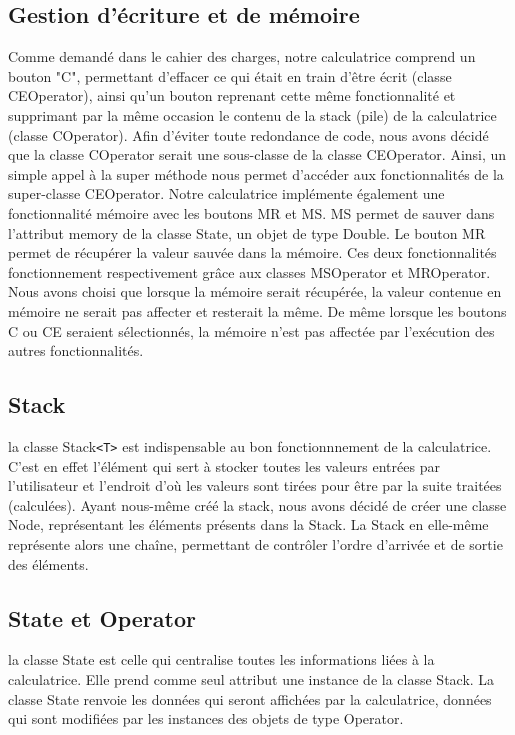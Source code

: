\documentclass[12pt]{report}
\begin{document}
        \subsection*{Gestion d'écriture et de mémoire}
            Comme demandé dans le cahier des charges, notre calculatrice comprend un bouton "C", permettant d'effacer ce qui était
    en train d'être écrit (classe CEOperator), ainsi qu'un bouton reprenant cette même fonctionnalité et supprimant par la même occasion le
    contenu de la stack (pile) de la calculatrice (classe COperator). Afin d'éviter toute redondance de code, nous avons décidé que
    la classe COperator serait une sous-classe de la classe CEOperator. Ainsi, un simple appel à la super méthode nous permet
    d'accéder aux fonctionnalités de la super-classe CEOperator.
    \newline Notre calculatrice implémente également une fonctionnalité mémoire avec les boutons MR et MS. MS permet de
    sauver dans l'attribut memory de la classe State, un objet de type Double. Le bouton MR permet de récupérer la valeur
    sauvée dans la mémoire. Ces deux fonctionnalités fonctionnement respectivement grâce aux classes MSOperator et MROperator.
    \newline Nous avons choisi que lorsque la mémoire serait récupérée, la valeur contenue en mémoire ne serait pas affecter et resterait
    la même. De même lorsque les boutons C ou CE seraient sélectionnés, la mémoire n'est pas affectée par l'exécution des autres
    fonctionnalités.

    \subsection*{Stack}
        la classe Stack\verb|<T>| est indispensable au bon fonctionnnement de la calculatrice. C'est en effet l'élément qui
    sert à stocker toutes les valeurs entrées par l'utilisateur et l'endroit d'où les valeurs sont tirées pour être par la suite traitées (calculées).
    \newline Ayant nous-même créé la stack, nous avons décidé de créer une classe Node, représentant les éléments présents dans la Stack.
    La Stack en elle-même représente alors une chaîne, permettant de contrôler l'ordre d'arrivée et de sortie des éléments.

    \subsection*{State et Operator}
        la classe State est celle qui centralise toutes les informations liées à la calculatrice. Elle prend comme seul attribut
    une instance de la classe Stack. La classe State renvoie les données qui seront affichées par la calculatrice, données qui
    sont modifiées par les instances des objets de type Operator.
\end{document}
